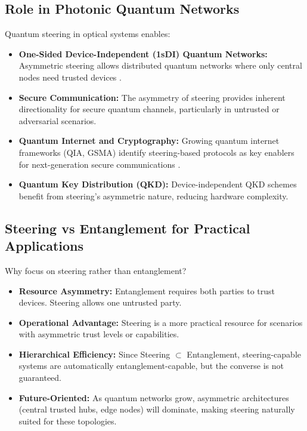 \subsection{Role in Photonic Quantum Networks}

Quantum steering in optical systems enables:

\begin{itemize}
	\item \textbf{One-Sided Device-Independent (1sDI) Quantum Networks:} Asymmetric steering allows distributed quantum networks where only central nodes need trusted devices \cite{branciardOnesidedDeviceIndependentQuantum2012}.

	\item \textbf{Secure Communication:} The asymmetry of steering provides inherent directionality for secure quantum channels, particularly in untrusted or adversarial scenarios.

	\item \textbf{Quantum Internet and Cryptography:} Growing quantum internet frameworks (QIA, GSMA) identify steering-based protocols as key enablers for next-generation secure communications \cite{downlingQuantumTechnology2003}.

	\item \textbf{Quantum Key Distribution (QKD):} Device-independent QKD schemes benefit from steering's asymmetric nature, reducing hardware complexity.
\end{itemize}

\subsection{Steering vs Entanglement for Practical Applications}

Why focus on steering rather than entanglement?

\begin{itemize}
	\item \textbf{Resource Asymmetry:} Entanglement requires both parties to trust devices. Steering allows one untrusted party.

	\item \textbf{Operational Advantage:} Steering is a more practical resource for scenarios with asymmetric trust levels or capabilities.

	\item \textbf{Hierarchical Efficiency:} Since Steering $\subset$ Entanglement, steering-capable systems are automatically entanglement-capable, but the converse is not guaranteed.

	\item \textbf{Future-Oriented:} As quantum networks grow, asymmetric architectures (central trusted hubs, edge nodes) will dominate, making steering naturally suited for these topologies.
\end{itemize}


